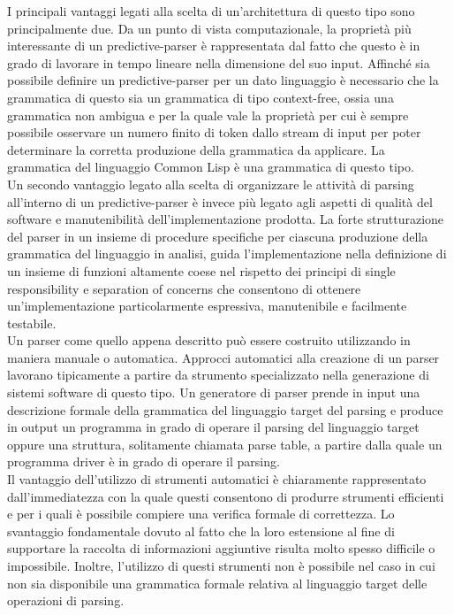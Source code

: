 I principali vantaggi legati alla scelta di un’architettura di questo tipo
sono principalmente due. Da un punto di vista computazionale, la proprietà più
interessante di un predictive-parser è rappresentata dal fatto che questo è in
grado di lavorare in tempo lineare nella dimensione del suo input. Affinché
sia possibile definire un predictive-parser per un dato linguaggio è
necessario che la grammatica di questo sia un grammatica di tipo context-free,
ossia una grammatica non ambigua e per la quale vale la proprietà per cui è
sempre possibile osservare un numero finito di token dallo stream di input per
poter determinare la corretta produzione della grammatica da applicare. La
grammatica del linguaggio Common Lisp è una grammatica di questo tipo.\\

Un secondo vantaggio legato alla scelta di organizzare le attività di parsing
all’interno di un predictive-parser è invece più legato agli aspetti di
qualità del software e manutenibilità dell’implementazione prodotta. La forte
strutturazione del parser in un insieme di procedure specifiche per ciascuna
produzione della grammatica del linguaggio in analisi, guida l’implementazione
nella definizione di un insieme di funzioni altamente coese nel rispetto dei
principi di single responsibility e separation of concerns che consentono di
ottenere un’implementazione particolarmente espressiva, manutenibile e
facilmente testabile.\\

Un parser come quello appena descritto può essere costruito utilizzando in
maniera manuale o automatica. Approcci automatici alla creazione di un parser
lavorano tipicamente a partire da strumento specializzato nella generazione di
sistemi software di questo tipo. Un generatore di parser prende in input una
descrizione formale della grammatica del linguaggio target del parsing e
produce in output un programma in grado di operare il parsing del linguaggio
target oppure una struttura, solitamente chiamata parse table, a partire dalla
quale un programma driver è in grado di operare il parsing.\\

Il vantaggio dell’utilizzo di strumenti automatici è chiaramente rappresentato
dall’immediatezza con la quale questi consentono di produrre strumenti
efficienti e per i quali è possibile compiere una verifica formale di
correttezza. Lo svantaggio fondamentale dovuto al fatto che la loro estensione
al fine di supportare la raccolta di informazioni aggiuntive risulta molto
spesso difficile o impossibile. Inoltre, l’utilizzo di questi strumenti non è
possibile nel caso in cui non sia disponibile una grammatica formale relativa
al linguaggio target delle operazioni di parsing.\\

